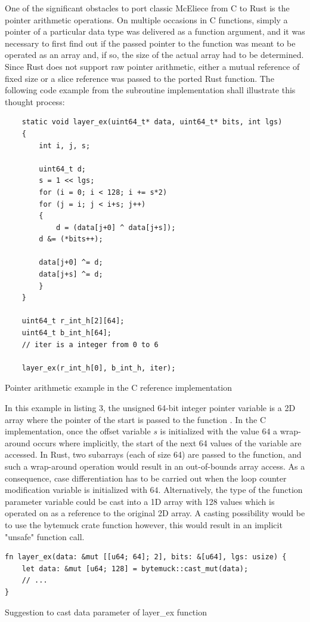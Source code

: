 \documentclass[11pt,
  oneside,openany,    %
]{scrreprt}
\begin{document}
One of the significant obstacles to port classic McEliece from C to Rust is the pointer arithmetic operations. On multiple occasions in C functions, simply a pointer of a particular data type was delivered as a function argument, and it was necessary to first find out if the passed pointer to the function was meant to be operated as an array and, if so, the size of the actual array had to be determined. Since Rust does not support raw pointer arithmetic, either a mutual reference of fixed size or a slice reference was passed to the ported Rust function. The following code example from the  subroutine implementation shall illustrate this thought process:
\begin{listing}[H]
\begin{verbatim}
    static void layer_ex(uint64_t* data, uint64_t* bits, int lgs)
    {
        int i, j, s;

        uint64_t d;
        s = 1 << lgs;
        for (i = 0; i < 128; i += s*2)
        for (j = i; j < i+s; j++)
        {
        	d = (data[j+0] ^ data[j+s]);
		d &= (*bits++);
    		
		data[j+0] ^= d;
		data[j+s] ^= d;
        }
    }

    uint64_t r_int_h[2][64];
    uint64_t b_int_h[64];
    // iter is a integer from 0 to 6
    
    layer_ex(r_int_h[0], b_int_h, iter);
\end{verbatim}
  \caption{Pointer arithmetic example in the C reference implementation}
  \label{list:Layer_ex_C}
\end{listing}
In this example in listing 3, the unsigned 64-bit integer pointer variable  is a 2D array where the pointer of the start is passed to the function . In the C implementation, once the offset variable $s$ is initialized with the value $64$ a wrap-around occurs where implicitly, the start of the next 64 values of the  variable are accessed. In Rust, two subarrays (each of size 64) are passed to the  function, and such a wrap-around operation would result in an out-of-bounds array access. As a consequence, case differentiation has to be carried out when the loop counter modification variable  is initialized with $64$. Alternatively, the type of the  function parameter variable could be cast into a 1D array with 128 values which is operated on as a reference to the original 2D array. A casting possibility would be to use the bytemuck crate function  however, this would result in an implicit "unsafe" function call.
\begin{listing}[H]
\begin{verbatim}
fn layer_ex(data: &mut [[u64; 64]; 2], bits: &[u64], lgs: usize) {
    let data: &mut [u64; 128] = bytemuck::cast_mut(data);
    // ...
}
\end{verbatim}
  \caption{Suggestion to cast data parameter of layer\_ex function}
  \label{list:Layer_ex_Rust_opt}
\end{listing}
\end{document}
